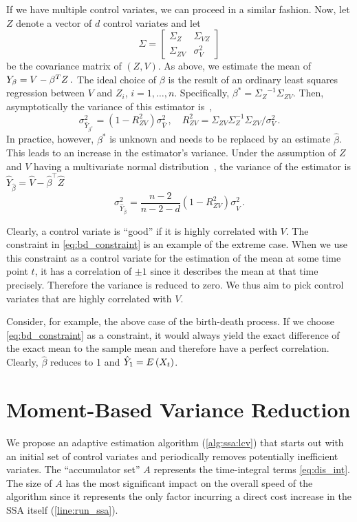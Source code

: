 If we have multiple control variates, we can proceed in a similar fashion.
Now, let ${Z}$ denote a vector of $d$ control variates and let
$$
\Sigma=
\begin{bmatrix}
\Sigma_{ Z} & \Sigma_{V Z}\\
\Sigma_{ Z V} & \sigma_V^2
\end{bmatrix}
$$
be the covariance matrix of $({Z},V)$.
As above, we estimate the mean of
$
    {Y}_{\beta}=V -{\beta}^{T}{Z}\,.
$
The ideal choice of $\beta$ is the result of an ordinary least squares regression between $V$
and $Z_i$, $i=1,\dots,n$.
Specifically, $\beta^{*}={\Sigma_{ Z}}^{-1}{\Sigma}_{ Z V}$.
Then, asymptotically
the variance of this estimator is~\cite{szechtman2003control},
\begin{equation}\label{eq:lcv_asym}
    {\sigma_{\hat Y_{\beta^*}}^2} = (1 - R_{ Z V}^2){\sigma_{\hat V}^2}\,, \quad
    R_{ Z V}^2=\Sigma_{ Z V}\Sigma_{ Z}^{-1}\Sigma_{ Z V} / \sigma_V^2\,.
\end{equation}
In practice, however, $\beta^*$ is unknown and needs to be replaced by
an estimate $\hat{\beta}$.
This leads to an increase in the estimator's variance.
Under the assumption of $Z$ and $V$ having a multivariate normal
distribution~\cite{cheng1978analysis,lavenberg1982statistical}, the variance of the estimator is
$\hat{Y}_{\hat{\beta}}=\hat{V}-\hat{\beta}^{\top}\hat{ Z}$
\begin{equation}\label{eq:lcv_norm_varred}
    {\sigma_{\hat{Y}_{\hat{\beta}}}^2} = \frac{n - 2}{n - 2 - d}(1 - R_{ ZV}^2){\sigma_{\hat V}^2}\,.
\end{equation}

Clearly, a control  variate is ``good'' if it is highly correlated with $V$.
The constraint in \eqref{eq:bd_constraint} is an example of the extreme case.
When we use this constraint as a control variate
for the estimation of the mean at some time point $t$, it has a correlation of $\pm1$
since it describes the mean at that time precisely.
Therefore the variance is reduced to zero.
We thus aim to pick control  variates that are highly correlated with $V$.

Consider, for example, the above case of the birth-death process.
If we choose \eqref{eq:bd_constraint} as a constraint, it would always yield
the exact difference of the exact mean to the sample mean and therefore have a 
perfect correlation. Clearly, $\hat\beta$ reduces to 1 and $\hat Y_1 = {E}\left(X_t\right)$.

\section{Moment-Based Variance Reduction}\label{sec:cv:algo}
We propose an adaptive estimation algorithm (\autoref{alg:ssa:lcv}) that starts out with
an initial set of control variates
and periodically removes potentially inefficient variates.
The ``accumulator set'' $A$ represents the time-integral terms \eqref{eq:dis_int}.
The size of $A$ has the most significant impact on the overall speed of the algorithm
since it represents the only factor incurring a direct cost increase in the \ac{SSA} itself (\autoref{line:run_ssa}).

